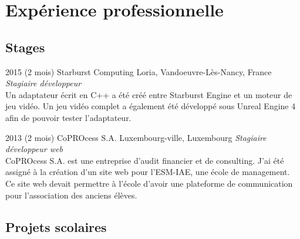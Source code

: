 \documentclass[]{cv_french} %
\begin{document}

\section{Expérience professionnelle}

\subsection{Stages}

\begin{entrylist}


\entry
{2015 (2 mois)}
{Starburst Computing}
{Loria, Vandoeuvre-Lès-Nancy, France}
{\emph{Stagiaire développeur} \\
Un adaptateur écrit en C++ a été créé entre Starburst Engine et un moteur de jeu vidéo. Un jeu vidéo complet a également été développé sous Unreal Engine 4 afin de pouvoir tester l'adaptateur. 
}

\entry
{2013 (2 mois)}
{CoPROcess S.A.}
{Luxembourg-ville, Luxembourg}
{\emph{Stagiaire développeur web} \\
CoPROcess S.A. est une entreprise d'audit financier et de consulting. J'ai été assigné à la création d'un site web pour l'ESM-IAE, une école de management. Ce site web devait permettre à l'école d'avoir une plateforme de communication pour l'association des anciens élèves.
}


\end{entrylist}

\subsection{Projets scolaires}
\end{document}

